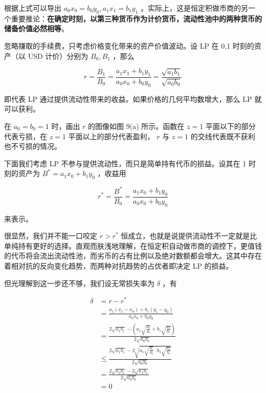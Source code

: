 \documentclass[12pt, a4paper, oneside]{ctexart}
\begin{document}
根据上式可以导出 $a_0x_0=b_0y_0, a_1x_1=b_1y_1$ 。实际上，这是恒定积做市商的另一个重要推论：\textbf{在确定时刻，以第三种货币作为计价货币，流动性池中的两种货币的储备价值必然相等}。

忽略赚取的手续费，只考虑价格变化带来的资产价值波动。设 LP 在 0,1 时刻的资产（以 USD 计价）分别为 $B_0,B_1$ ，那么

\begin{equation}
    r = \frac{B_1}{B_0} 
    = \frac{a_1x_1+b_1y_1}{a_0x_0+b_0y_0} 
    = \frac{\sqrt{a_1b_1}}{\sqrt{a_0b_0}}
\end{equation}

\noindent 即代表 LP 通过提供流动性带来的收益。如果价格的几何平均数增大，那么 LP 就可以获利。

在 $a_0=b_0=1$ 时，画出 $r$ 的图像如图 9(a) 所示。函数在 $z=1$ 平面以下的部分代表亏损，在 $z=1$ 平面以上的部分代表盈利， $r$ 与 $z=1$ 的交线代表既不获利也不亏损的情况。

下面我们考虑 LP 不参与提供流动性，而只是简单持有代币的损益。设其在 1 时刻的资产为 $B^* = a_1x_0+b_1y_0$ ，收益用

\begin{equation}
    r^* = \frac{B^*}{B_0} = \frac{a_1x_0+b_1y_0}{a_0x_0+b_0y_0}
\end{equation}

\noindent 来表示。

很显然，我们并不能一口咬定 $r>r^*$ 恒成立，也就是说提供流动性不一定就是比单纯持有更好的选择。直观而肤浅地理解，在恒定积自动做市商的调控下，更值钱的代币将会流出流动性池，而劣币的占有比例以及绝对数额都会增大。这其中存在着相对抗的反向变化趋势，而两种对抗趋势的占优者即决定 LP 的损益。

但光理解到这一步还不够，我们设无常损失率为 $\delta$ ，有

\begin{equation}
    \begin{aligned}
        \delta 
        & = r - r^*  \\ 
        & = \frac{a_1(x_1-x_0) + b_1(y_1-y_0)}{a_0x_0 + b_0y_0} \\
        & = \frac{2\sqrt{a_1b_1} - \left( a_1\sqrt{\frac{b_0}{a_0}} + b_1\sqrt{\frac{a_0}{b_0}} \right)}{2\sqrt{a_0b_0}} \\
        & \le \frac{2\sqrt{a_1b_1} - 2\sqrt{a_1\sqrt{\frac{b_0}{a_0}} \cdot b_1\sqrt{\frac{a_0}{b_0}}}}{2\sqrt{a_0b_0}} \\
        & = \frac{2\sqrt{a_1b_1} - 2\sqrt{a_1b_1}}{2\sqrt{a_0b_0}} \\
        & = 0
    \end{aligned}
\end{equation}
\end{document}
